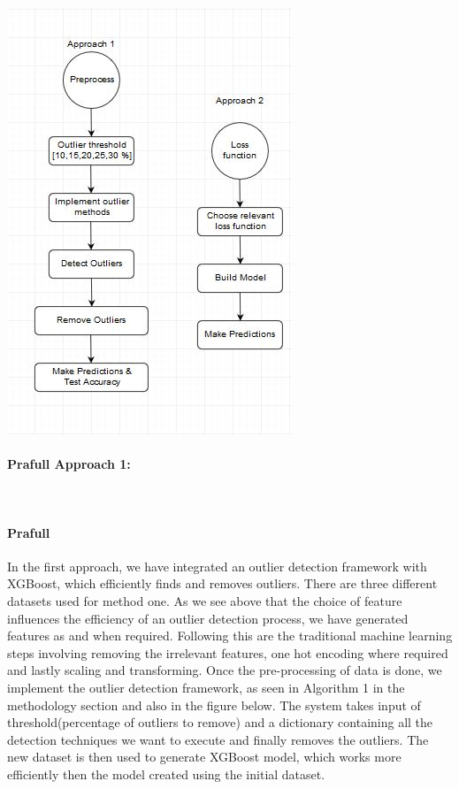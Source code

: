 \documentclass[runningheads]{llncs}
\begin{document}
\includegraphics[scale=0.7]{arch.JPG}

\paragraph{Prafull Approach 1:} \\
\paragraph{Prafull} In the first approach, we have integrated an outlier detection framework with XGBoost, which efficiently finds and removes outliers. There are three different datasets used for method one. As we see above that the choice of feature influences the efficiency of an outlier detection process, we have generated features as and when required. Following this are the traditional machine learning steps involving removing the irrelevant features, one hot encoding where required and lastly scaling and transforming. Once the pre-processing of data is done, we implement the outlier detection framework, as seen in Algorithm 1 in the methodology section and also in the figure below. The system takes input of threshold(percentage of outliers to remove) and a dictionary containing all the detection techniques we want to execute and finally removes the outliers. The new dataset is then used to generate XGBoost model, which works more efficiently then the model created using the initial dataset. \\
\end{document}
